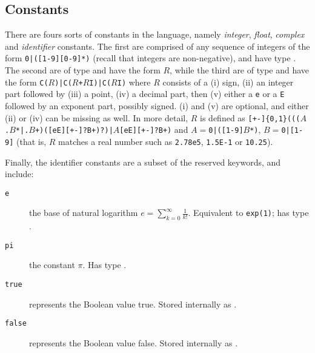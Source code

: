 \subsection{Constants}
There are fours sorts of constants in the language, namely \emph{integer}, \emph{float}, \emph{complex} and \emph{identifier} constants. The first are comprised of any sequence of integers of the form \texttt{0|([1-9][0-9]*)} (recall that integers are non-negative), and have type \integ. The second are of type \float  and have the form \texttt{$R$}, while the third are of type \complex and have the form 
\texttt{C($R$)|C($R$+$R$I)|C($R$I)}
where $R$ consists of a \textsf{(i)} sign, \textsf{(ii)} an integer part followed by \textsf{(iii)} a point, \textsf{(iv)} a decimal part, then  \textsf{(v)} either a \texttt{e} or a \texttt{E} followed by an exponent part, possibly signed. \textsf{(i)} and \textsf{(v)} are optional, and either \textsf{(ii)} or \textsf{(iv)} can be missing as well. In more detail, $R$ 
is defined as \texttt{[+-]\{0,1\}((($A$.$B$*|.$B$+)([eE][+-]?B+)?)|$A$[eE][+-]?B+)} and $A=$\texttt{0|([1-9]$B$*)}, $B=$\texttt{0|[1-9]} (that is, $R$ matches a real number such as \texttt{2.78e5}, \texttt{1.5E-1} or \texttt{10.25}).

\noindent Finally, the identifier constants are a subset of the reserved keywords, and include:
\begin{description}
  \item[\texttt{e}] the base of natural logarithm $e=\sum_{k=0}^\infty \frac{1}{k!}$. Equivalent to \texttt{exp(1)}; has type \complex.
  \item[\texttt{pi}] the constant $\pi$. Has type \float.
  \item[\texttt{true}] represents the Boolean value \textsf{true}. Stored internally  as .
  \item[\texttt{false}] represents the Boolean value \textsf{false}. Stored internally  as .
\end{description}
